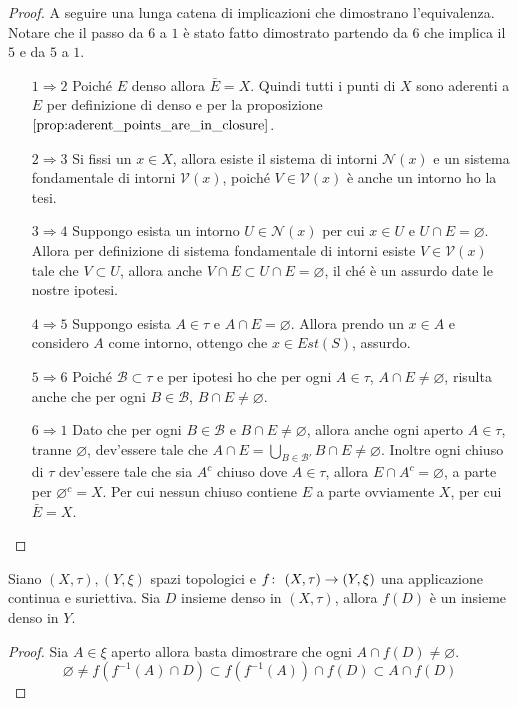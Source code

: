 \begin{proof}
	A seguire una lunga catena di implicazioni che dimostrano l'equivalenza. Notare che il passo da $6$ a $1$ è stato fatto dimostrato partendo da $6$ che implica il $5$ e da $5$ a $1$.
	\begin{enumerate}
		\item[$1 \Rightarrow 2$] Poiché $E$ denso allora $\bar{E} = X$. Quindi tutti i punti di $X$ sono aderenti a $E$ per definizione di denso e per la proposizione $\ref{prop:aderent_points_are_in_closure}$.
		\item[$2 \Rightarrow 3$] Si fissi un $x \in X$, allora esiste il sistema di intorni $\mathcal{N}(x)$ e un sistema fondamentale di intorni $\mathcal{V}(x)$, poiché $V \in \mathcal{V}(x)$ è anche un intorno ho la tesi.
		\item[$3 \Rightarrow 4$] Suppongo esista un intorno $U \in \mathcal{N}(x)$ per cui $x \in U$ e $U \cap E = \varnothing$. Allora per definizione di sistema fondamentale di intorni esiste $V \in \mathcal{V}(x)$ tale che $V \subset U$, allora anche $V \cap E \subset U \cap E = \varnothing$, il ché è un assurdo date le nostre ipotesi.  
		\item[$4 \Rightarrow 5$] Suppongo esista $A \in \tau$ e $A \cap E = \varnothing$. Allora prendo un $x \in A$ e considero $A$ come intorno, ottengo che $x \in Est(S)$, assurdo.  
		\item[$5 \Rightarrow 6$] Poiché $\mathcal{B} \subset \tau$ e per ipotesi ho che per ogni $A \in \tau$, $A \cap E \neq \varnothing$, risulta anche che per ogni $B \in \mathcal{B}$, $B \cap E \neq \varnothing$.
		\item[$6 \Rightarrow 1$] Dato che per ogni $B \in \mathcal{B}$ e $B \cap E \neq \varnothing$, allora anche ogni aperto $A \in \tau$, tranne $\varnothing$, dev'essere tale che $ A \cap E = \bigcup_{B \in \mathcal{B}'} B \cap E \neq \varnothing$. Inoltre ogni chiuso di $\tau$ dev'essere tale che sia $A^c$ chiuso dove $A \in \tau$, allora $E \cap A^c = \varnothing$, a parte per $\varnothing^c = X$. Per cui nessun chiuso contiene $E$ a parte ovviamente $X$, per cui $\bar{E} = X$.
	\end{enumerate}
\end{proof}

\begin{theorem}
	Siano $(X,\tau), (Y, \xi)$ spazi topologici e $f \colon\ (X,\tau) \rightarrow (Y,\xi)$ una applicazione continua e suriettiva. Sia $D$ insieme denso in $(X,\tau)$, allora $f(D)$ è un insieme denso in $Y$.
\end{theorem}
\begin{proof}
	Sia $A \in \xi$ aperto allora basta dimostrare che ogni $A \cap f(D) \neq \varnothing$. 
	\begin{equation*}
		\varnothing \neq f(f^{-1}(A) \cap D) \subset f(f^{-1}(A)) \cap f(D) \subset A \cap f(D) 
	\end{equation*}
\end{proof}

